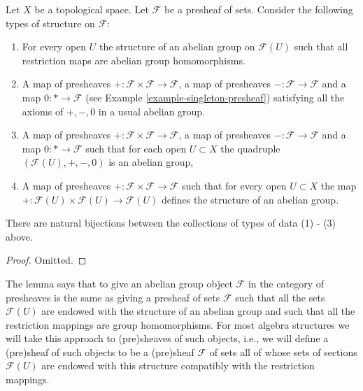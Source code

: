 \begin{lemma}
\label{lemma-abelian-presheaves}
Let $X$ be a topological space.
Let $\mathcal{F}$ be a presheaf of sets.
Consider the following types of structure on $\mathcal{F}$:
\begin{enumerate}
\item For every open $U$ the structure of an abelian group
on $\mathcal{F}(U)$ such that all restriction maps are
abelian group homomorphisms.
\item A map of presheaves
$+ : \mathcal{F} \times \mathcal{F} \to \mathcal{F}$,
a map of presheaves $- : \mathcal{F} \to \mathcal{F}$
and a map $0 : * \to \mathcal{F}$
(see Example \ref{example-singleton-presheaf})
satisfying all the axioms of $+, -, 0$ in a usual
abelian group.
\item A map of presheaves
$+ : \mathcal{F} \times \mathcal{F} \to \mathcal{F}$,
a map of presheaves $- : \mathcal{F} \to \mathcal{F}$
and a map $0 : * \to \mathcal{F}$
such that for each open $U \subset X$ the quadruple
$(\mathcal{F}(U), +, -, 0)$ is an abelian group,
\item A map of presheaves $+ : \mathcal{F} \times \mathcal{F}
\to \mathcal{F}$ such that for every open $U \subset X$
the map $+ : \mathcal{F}(U) \times \mathcal{F}(U) \to \mathcal{F}(U)$
defines the structure of an abelian group.
\end{enumerate}
There are natural bijections between the collections of
types of data (1) - (3) above.
\end{lemma}

\begin{proof}
Omitted.
\end{proof}

\noindent
The lemma says that to give an abelian group object $\mathcal{F}$
in the category of presheaves is the same as giving a presheaf of sets
$\mathcal{F}$ such that all the sets $\mathcal{F}(U)$ are endowed
with the structure of an abelian group and such that all the restriction
mappings are group homomorphisms. For most algebra structures
we will take this approach to (pre)sheaves of such objects, i.e.,
we will define a (pre)sheaf of such objects to be a (pre)sheaf
$\mathcal{F}$ of sets all of whose sets of sections $\mathcal{F}(U)$
are endowed with this structure compatibly with the restriction
mappings.

